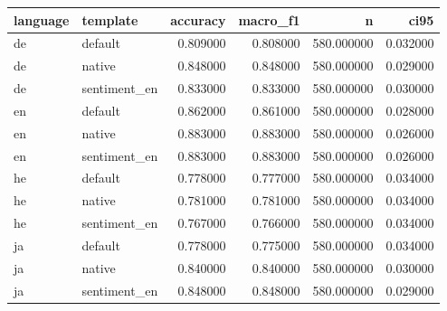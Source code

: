 \begin{tabular}{llrrrr}
\toprule
language & template & accuracy & macro_f1 & n & ci95 \\
\midrule
de & default & 0.809000 & 0.808000 & 580.000000 & 0.032000 \\
de & native & 0.848000 & 0.848000 & 580.000000 & 0.029000 \\
de & sentiment_en & 0.833000 & 0.833000 & 580.000000 & 0.030000 \\
en & default & 0.862000 & 0.861000 & 580.000000 & 0.028000 \\
en & native & 0.883000 & 0.883000 & 580.000000 & 0.026000 \\
en & sentiment_en & 0.883000 & 0.883000 & 580.000000 & 0.026000 \\
he & default & 0.778000 & 0.777000 & 580.000000 & 0.034000 \\
he & native & 0.781000 & 0.781000 & 580.000000 & 0.034000 \\
he & sentiment_en & 0.767000 & 0.766000 & 580.000000 & 0.034000 \\
ja & default & 0.778000 & 0.775000 & 580.000000 & 0.034000 \\
ja & native & 0.840000 & 0.840000 & 580.000000 & 0.030000 \\
ja & sentiment_en & 0.848000 & 0.848000 & 580.000000 & 0.029000 \\
\bottomrule
\end{tabular}
